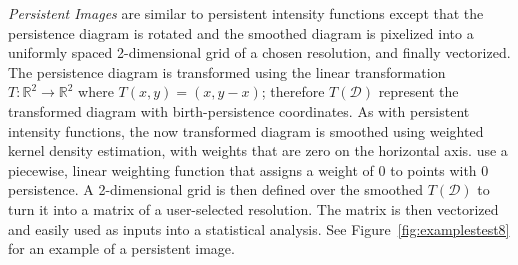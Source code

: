 \documentclass[12pt]{article}
\begin{document}
\emph{Persistent Images} are similar to persistent intensity functions \citep{adams2015persistent} except that the persistence diagram is rotated and the smoothed diagram is pixelized into a uniformly spaced 2-dimensional grid of a chosen resolution, and finally vectorized.   The persistence diagram is transformed using the linear transformation $T: \mathbb{R}^{2} \rightarrow \mathbb{R}^{2}$ where $T(x,y) = (x, y-x)$; therefore $T(\mathcal{D})$ represent the transformed diagram with birth-persistence coordinates.  As with persistent intensity functions, the now transformed diagram is smoothed using weighted kernel density estimation, with weights that are zero on the horizontal axis.  \cite{adams2015persistent} use a piecewise, linear weighting function that assigns a weight of 0 to points with 0 persistence.
A 2-dimensional grid is then defined over the smoothed $T(\mathcal D)$ to turn it into a matrix of a user-selected resolution.  The matrix is then vectorized and easily used as inputs into a statistical analysis.   See Figure~\ref{fig:examplestest8} for an example of a persistent image.
\end{document}
